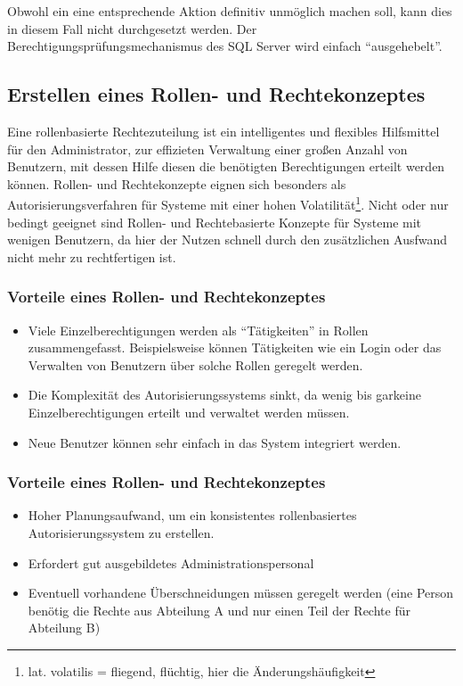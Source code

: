           Obwohl ein  eine entsprechende Aktion definitiv
          unmöglich machen soll, kann dies in diesem Fall nicht durchgesetzt
          werden. Der Berechtigungsprüfungsmechanismus des SQL Server wird
          einfach \enquote{ausgehebelt}.
      \subsection{Erstellen eines Rollen- und Rechtekonzeptes}
        Eine rollenbasierte Rechtezuteilung ist ein intelligentes und flexibles
        Hilfsmittel für den Administrator, zur effizieten Verwaltung einer
        großen Anzahl von Benutzern, mit dessen Hilfe diesen die benötigten
        Berechtigungen erteilt werden können. Rollen- und Rechtekonzepte eignen
        sich besonders als Autorisierungsverfahren für Systeme mit einer hohen
        Volatilität\footnote{lat. volatilis = fliegend, flüchtig, hier die
        Änderungshäufigkeit}. Nicht oder nur bedingt geeignet sind Rollen- und
        Rechtebasierte Konzepte für Systeme mit wenigen Benutzern, da hier der
        Nutzen schnell durch den zusätzlichen Ausfwand nicht mehr zu
        rechtfertigen ist.
        \subsubsection{Vorteile eines Rollen- und Rechtekonzeptes}
          \begin{itemize}
            \item Viele Einzelberechtigungen werden als \enquote{Tätigkeiten} in
            Rollen zusammengefasst. Beispielsweise können Tätigkeiten wie ein
            Login oder das Verwalten von Benutzern über solche Rollen geregelt
            werden.
            \item Die Komplexität des Autorisierungssystems sinkt, da wenig bis
            garkeine Einzelberechtigungen erteilt und verwaltet werden müssen.
            \item Neue Benutzer können sehr einfach in das System integriert
            werden.
          \end{itemize}
        \subsubsection{Vorteile eines Rollen- und Rechtekonzeptes}
          \begin{itemize}
            \item Hoher Planungsaufwand, um ein konsistentes rollenbasiertes
            Autorisierungssystem zu erstellen.
            \item Erfordert gut ausgebildetes Administrationspersonal
            \item Eventuell vorhandene Überschneidungen müssen geregelt werden
            (eine Person benötig die Rechte aus Abteilung A und nur einen Teil
            der Rechte für Abteilung B)
          \end{itemize}
